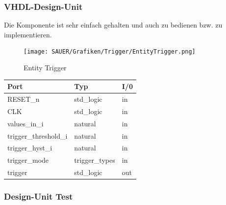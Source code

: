 \subsubsection{VHDL-Design-Unit}
Die Komponente ist sehr einfach gehalten und auch zu bedienen bzw. zu implementieren. 
\begin{figure}[h]
	\begin{center}
		\texttt{[image: SAUER/Grafiken/Trigger/EntityTrigger.png]}
		\caption{Entity Trigger}
	\end{center}
\end{figure}
\begin{tabular}[h]{|l|l|l|}
	\hline
	Port & Typ & I/0\\
	\hline\hline
	RESET\_n & std\_logic & in\\
	\hline
	CLK & std\_logic & in\\
	\hline
	values\_in\_i & natural & in\\
	\hline
	trigger\_threshold\_i & natural & in\\
	\hline
	trigger\_hyst\_i & natural & in\\
	\hline
	trigger\_mode & trigger\_types & in\\
	\hline
	trigger & std\_logic & out\\
	\hline
\end{tabular}
\subsubsection{Design-Unit Test}